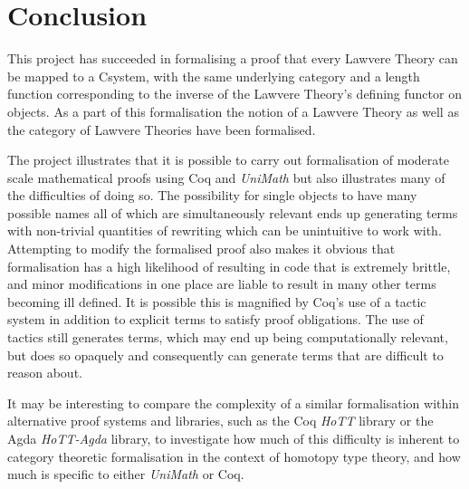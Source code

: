 \chapter{Conclusion}
This project has succeeded in formalising a proof that every Lawvere Theory can
be mapped to a Csystem, with the same underlying category and a length function
corresponding to the inverse of the Lawvere Theory's defining functor on
objects. As a part of this formalisation the notion of a Lawvere Theory as well
as the category of Lawvere Theories have been formalised.

The project illustrates that it is possible to carry out formalisation of
moderate scale mathematical proofs using Coq and \textit{UniMath} but also
illustrates many of the difficulties of doing so. The possibility for single
objects to have many possible names all of which are simultaneously relevant
ends up generating terms with non-trivial quantities of rewriting which can be
unintuitive to work with. Attempting to modify the formalised proof also makes
it obvious that formalisation has a high likelihood of resulting in code that is
extremely brittle, and minor modifications in one place are liable to result in
many other terms becoming ill defined. It is possible this is magnified by Coq's
use of a tactic system in addition to explicit terms to satisfy proof
obligations. The use of tactics still generates terms, which may end up being
computationally relevant, but does so opaquely and consequently can generate
terms that are difficult to reason about.

It may be interesting to compare the complexity of a similar formalisation
within alternative proof systems and libraries, such as the Coq \textit{HoTT}
library or the Agda \textit{HoTT-Agda} library, to investigate how much of this
difficulty is inherent to category theoretic formalisation in the context of
homotopy type theory, and how much is specific to either \textit{UniMath} or
Coq.